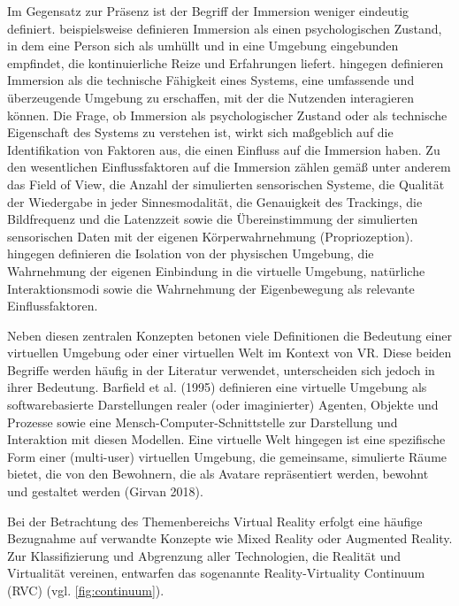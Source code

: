 Im Gegensatz zur Präsenz ist der Begriff der Immersion weniger eindeutig definiert. \citet{witmer_measuring_1998} beispielsweise definieren Immersion als einen psychologischen Zustand, in dem eine Person sich als umhüllt und in eine Umgebung eingebunden empfindet, die kontinuierliche Reize und Erfahrungen liefert. \citet{sanchez-vives_presence_2005} hingegen definieren Immersion als die technische Fähigkeit eines Systems, eine umfassende und überzeugende Umgebung zu erschaffen, mit der die Nutzenden interagieren können. 
Die Frage, ob Immersion als psychologischer Zustand oder als technische Eigenschaft des Systems zu verstehen ist, wirkt sich maßgeblich auf die Identifikation von Faktoren aus, die einen Einfluss auf die Immersion haben. 
Zu den wesentlichen Einflussfaktoren auf die Immersion zählen gemäß  \citet{sanchez-vives_presence_2005} unter anderem das Field of View, die Anzahl der simulierten sensorischen Systeme, die Qualität der Wiedergabe in jeder Sinnesmodalität, die Genauigkeit des Trackings, die Bildfrequenz und die Latenzzeit sowie die Übereinstimmung der simulierten sensorischen Daten mit der eigenen Körperwahrnehmung (Propriozeption). \citet{witmer_measuring_1998} hingegen definieren die Isolation von der physischen Umgebung, die Wahrnehmung der eigenen Einbindung in die virtuelle Umgebung, natürliche Interaktionsmodi sowie die Wahrnehmung der Eigenbewegung als relevante Einflussfaktoren. 

Neben diesen zentralen Konzepten betonen viele Definitionen die Bedeutung einer virtuellen Umgebung oder einer virtuellen Welt im Kontext von VR. Diese beiden Begriffe werden häufig in der Literatur verwendet, unterscheiden sich jedoch in ihrer Bedeutung. Barfield et al. (1995) definieren eine virtuelle Umgebung als softwarebasierte Darstellungen realer (oder imaginierter) Agenten, Objekte und Prozesse sowie eine Mensch-Computer-Schnittstelle zur Darstellung und Interaktion mit diesen Modellen. Eine virtuelle Welt hingegen ist eine spezifische Form einer (multi-user) virtuellen Umgebung, die gemeinsame, simulierte Räume bietet, die von den Bewohnern, die als Avatare repräsentiert werden, bewohnt und gestaltet werden (Girvan 2018).

Bei der Betrachtung des Themenbereichs Virtual Reality erfolgt eine häufige Bezugnahme auf verwandte Konzepte wie Mixed Reality oder Augmented Reality. Zur Klassifizierung und Abgrenzung aller Technologien, die Realität und Virtualität vereinen, entwarfen \citet{milgram_augmented_1995} das sogenannte Reality-Virtuality Continuum (RVC) (vgl. \autoref{fig:continuum}). 

